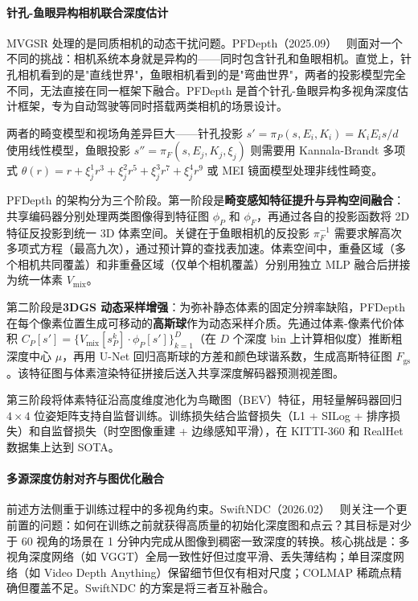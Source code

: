\paragraph{针孔-鱼眼异构相机联合深度估计}

MVGSR 处理的是同质相机的动态干扰问题。PFDepth（2025.09）~\cite{2509_26008} 则面对一个不同的挑战：相机系统本身就是异构的——同时包含针孔和鱼眼相机。直觉上，针孔相机看到的是"直线世界"，鱼眼相机看到的是"弯曲世界"，两者的投影模型完全不同，无法直接在同一框架下融合。PFDepth 是首个针孔-鱼眼异构多视角深度估计框架，专为自动驾驶等同时搭载两类相机的场景设计。

两者的畸变模型和视场角差异巨大——针孔投影 $s' = \pi_P(s, E_i, K_i) = K_i E_i s / d$ 使用线性模型，鱼眼投影 $s'' = \pi_F(s, E_j, K_j, \xi_j)$ 则需要用 Kannala-Brandt 多项式 $\theta(r) = r + \xi_j^1 r^3 + \xi_j^2 r^5 + \xi_j^3 r^7 + \xi_j^4 r^9$ 或 MEI 镜面模型处理非线性畸变。

PFDepth 的架构分为三个阶段。第一阶段是\textbf{畸变感知特征提升与异构空间融合}：共享编码器分别处理两类图像得到特征图 $\phi_P$ 和 $\phi_F$，再通过各自的投影函数将 2D 特征反投影到统一 3D 体素空间。关键在于鱼眼相机的反投影 $\pi_F^{-1}$ 需要求解高次多项式方程（最高九次），通过预计算的查找表加速。体素空间中，重叠区域（多个相机共同覆盖）和非重叠区域（仅单个相机覆盖）分别用独立 MLP 融合后拼接为统一体素 $V_{\text{mix}}$。

第二阶段是\textbf{3DGS 动态采样增强}：为弥补静态体素的固定分辨率缺陷，PFDepth 在每个像素位置生成可移动的\textbf{高斯球}作为动态采样介质。先通过体素-像素代价体积 $C_P[s'] = \{V_{\text{mix}}[s_P^k] \cdot \phi_P[s']\}_{k=1}^D$（在 $D$ 个深度 bin 上计算相似度）推断粗深度中心 $\mu$，再用 U-Net 回归高斯球的方差和颜色球谐系数，生成高斯特征图 $F_{\text{gs}}$。该特征图与体素渲染特征拼接后送入共享深度解码器预测视差图。

第三阶段将体素特征沿高度维度池化为鸟瞰图（BEV）特征，用轻量解码器回归 $4 \times 4$ 位姿矩阵支持自监督训练。训练损失结合监督损失（L1 + SILog + 排序损失）和自监督损失（时空图像重建 + 边缘感知平滑），在 KITTI-360 和 RealHet 数据集上达到 SOTA。

\paragraph{多源深度仿射对齐与图优化融合}

前述方法侧重于训练过程中的多视角约束。SwiftNDC（2026.02）~\cite{2602_22565} 则关注一个更前置的问题：如何在训练之前就获得高质量的初始化深度图和点云？其目标是对少于 60 视角的场景在 1 分钟内完成从图像到稠密一致深度的转换。核心挑战是：多视角深度网络（如 VGGT）全局一致性好但过度平滑、丢失薄结构；单目深度网络（如 Video Depth Anything）保留细节但仅有相对尺度；COLMAP 稀疏点精确但覆盖不足。SwiftNDC 的方案是将三者互补融合。

